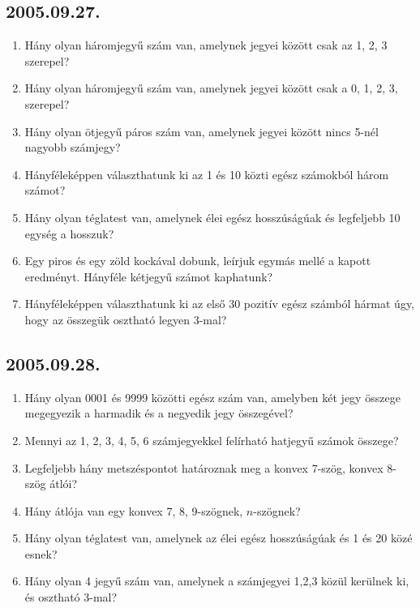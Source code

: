 \documentclass{article}
\begin{document}
\subsection*{2005.09.27.}
\begin{enumerate}
\item Hány olyan háromjegyű szám van, amelynek jegyei között csak az 1, 2, 3 szerepel?

\item Hány olyan háromjegyű szám van, amelynek jegyei között csak a 0, 1, 2, 3, szerepel?

\item Hány olyan ötjegyű páros szám van, amelynek jegyei között nincs 5-nél nagyobb számjegy?

\item Hányféleképpen választhatunk ki az 1 és 10 közti egész számokból három számot?

\item Hány olyan téglatest van, amelynek élei egész hosszúságúak és legfeljebb 10 egység a hosszuk?

\item Egy piros és egy zöld kockával dobunk, leírjuk egymás mellé a kapott eredményt. Hányféle kétjegyű számot kaphatunk?

\item Hányféleképpen választhatunk ki az első 30 pozitív egész számból hármat úgy, hogy az összegük osztható legyen 3-mal?
\end{enumerate}


\subsection*{2005.09.28.}
\begin{enumerate}
\item Hány olyan 0001 és 9999 közötti egész szám van, amelyben két jegy összege megegyezik a harmadik és a negyedik jegy összegével?

\item Mennyi az 1, 2, 3, 4, 5, 6 számjegyekkel felírható hatjegyű számok összege?

\item Legfeljebb hány metszéspontot határoznak meg a konvex 7-szög, konvex 8-szög átlói?

\item Hány átlója van egy konvex 7, 8, 9-szögnek, 
$n$-szögnek?

\item Hány olyan téglatest van, amelynek az élei egész hosszúságúak és 1 és 20 közé esnek?

\item Hány olyan 4 jegyű szám van, amelynek a számjegyei 1,2,3 közül kerülnek ki, és osztható 
3-mal?
\end{enumerate}
\end{document}

